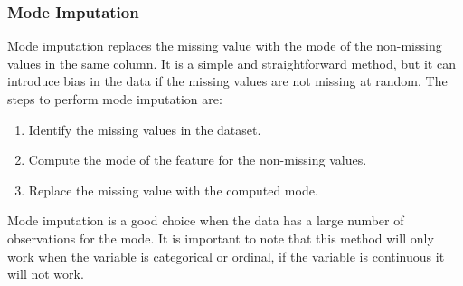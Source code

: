 \documentclass{article}
\begin{document}
\subsubsection*{Mode Imputation}
Mode imputation replaces the missing value with the mode of the non-missing values in the same column. It is a simple and straightforward method, but it can introduce bias in the data if the missing values are not missing at random. The steps to perform mode imputation are:
\begin{enumerate}
    \item Identify the missing values in the dataset.
    \item Compute the mode of the feature for the non-missing values.
    \item Replace the missing value with the computed mode.
\end{enumerate}
Mode imputation is a good choice when the data has a large number of observations for the mode. It is important to note that this method will only work when the variable is categorical or ordinal, if the variable is continuous it will not work. 
\end{document}
